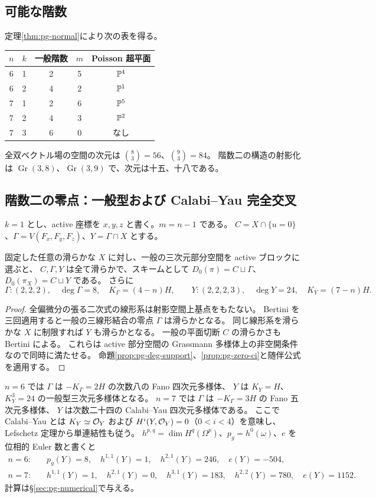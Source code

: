 \subsection{可能な階数}
定理\ref{thm:pg-normal}により次の表を得る。
\begin{center}
\begin{tabular}{ccccc}\toprule
$n$ & $k$ & 一般階数 & $m$ & Poisson 超平面\\\midrule
6&1&2&5&$\mathbb P^4$\\
6&2&4&2&$\mathbb P^1$\\
7&1&2&6&$\mathbb P^5$\\
7&2&4&3&$\mathbb P^2$\\
7&3&6&0&なし\\\bottomrule
\end{tabular}
\end{center}
全双ベクトル場の空間の次元は $\binom83=56$、$\binom93=84$。
階数二の構造の射影化は $\operatorname{Gr}(3,8)$、$\operatorname{Gr}(3,9)$ で、次元は十五、十八である。

\subsection{階数二の零点：一般型および Calabi--Yau 完全交叉}
$k=1$ とし、active 座標を $x,y,z$ と書く。$m=n-1$ である。
$C=X\cap\{u=0\}$、$\Gamma=V(F_x,F_y,F_z)$、$Y=\Gamma\cap X$ とする。
\begin{proposition}\label{prop:pg-rank2}
固定した任意の滑らかな $X$ に対し、一般の三次元部分空間を active ブロックに選ぶと、
$C,\Gamma,Y$ は全て滑らかで、スキームとして
$D_0(\pi)=C\sqcup\Gamma$、$D_0(\pi_X)=C\sqcup Y$ である。
さらに
\[
\Gamma:(2,2,2),\quad\deg\Gamma=8,\quad K_\Gamma=(4-n)H,
\qquad
Y:(2,2,2,3),\quad\deg Y=24,\quad K_Y=(7-n)H.
\]
\end{proposition}
\begin{proof}
全偏微分の張る二次式の線形系は射影空間上基点をもたない。
Bertini を三回適用すると一般の三線形結合の零点 $\Gamma$ は滑らかとなる。
同じ線形系を滑らかな $X$ に制限すれば $Y$ も滑らかとなる。
一般の平面切断 $C$ の滑らかさも Bertini による。
これらは active 部分空間の Grassmann 多様体上の非空開条件なので同時に満たせる。
命題\ref{prop:pg-deg-support}、\ref{prop:pg-zero-ci}と随伴公式を適用する。
\end{proof}
$n=6$ では $\Gamma$ は $-K_\Gamma=2H$ の次数八の Fano 四次元多様体、
$Y$ は $K_Y=H$、$K_Y^3=24$ の一般型三次元多様体となる。
$n=7$ では $\Gamma$ は $-K_\Gamma=3H$ の Fano 五次元多様体、
$Y$ は次数二十四の Calabi--Yau 四次元多様体である。
ここで Calabi--Yau とは $K_Y\simeq\mathcal O_Y$ および $H^i(Y,\mathcal O_Y)=0$（$0<i<4$）を意味し、
Lefschetz 定理から単連結性も従う。
$h^{p,q}=\dim H^q(\Omega^p)$、$p_g=h^0(\omega)$、$e$ を位相的 Euler 数と書くと
\begin{align*}
n=6:&\quad p_g(Y)=8,\quad h^{1,1}(Y)=1,\quad h^{2,1}(Y)=246,\quad e(Y)=-504,\\
n=7:&\quad h^{1,1}(Y)=1,\quad h^{2,1}(Y)=0,\quad h^{3,1}(Y)=183,\quad h^{2,2}(Y)=780,\quad e(Y)=1152.
\end{align*}
計算は\S\ref{sec:pg-numerical}で与える。

